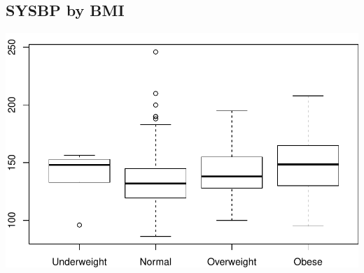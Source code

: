 \documentclass{article}
\begin{document}
\subsection*{SYSBP by BMI}
\begin{center}
\includegraphics{ass2-003}
\end{center}
\end{document}
